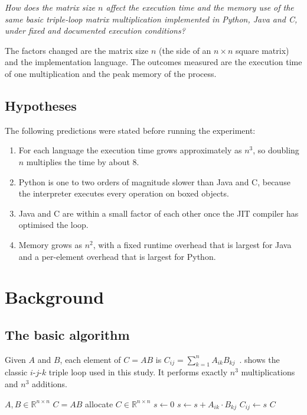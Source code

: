 \documentclass[12pt,a4paper]{report}
\begin{document}
\textit{How does the matrix size $n$ affect the execution time and the memory use of the same basic triple-loop
matrix multiplication implemented in Python, Java and C, under fixed and documented execution conditions?}

The factors changed are the matrix size $n$ (the side of an $n \times n$ square matrix) and the implementation
language. The outcomes measured are the execution time of one multiplication and the peak memory of the process.

\section{Hypotheses}

The following predictions were stated before running the experiment:
\begin{enumerate}[label=\textbf{H\arabic*.}]
  \item For each language the execution time grows approximately as $n^3$, so doubling $n$ multiplies the time by about 8.
  \item Python is one to two orders of magnitude slower than Java and C, because the interpreter executes every operation on boxed objects.
  \item Java and C are within a small factor of each other once the JIT compiler has optimised the loop.
  \item Memory grows as $n^2$, with a fixed runtime overhead that is largest for Java and a per-element overhead that is largest for Python.
\end{enumerate}

\chapter{Background}

\section{The basic algorithm}

Given $A$ and $B$, each element of $C = AB$ is $C_{ij} = \sum_{k=1}^{n} A_{ik} B_{kj}$~\cite{golub2013}.
 shows the classic $i$-$j$-$k$ triple loop used in this study. It performs exactly $n^3$
multiplications and $n^3$ additions.

\begin{algorithm}[H]
\caption{Basic $i$-$j$-$k$ matrix multiplication}
\label{alg:triple}
\begin{algorithmic}[1]
\Require $A, B \in \mathbb{R}^{n \times n}$
\Ensure $C = AB$
\State allocate $C \in \mathbb{R}^{n \times n}$
    \State $s \gets 0$
      \State $s \gets s + A_{ik} \cdot B_{kj}$
    \EndFor
    \State $C_{ij} \gets s$
  \EndFor
\EndFor
\State \Return $C$
\end{algorithmic}
\end{algorithm}
\end{document}
